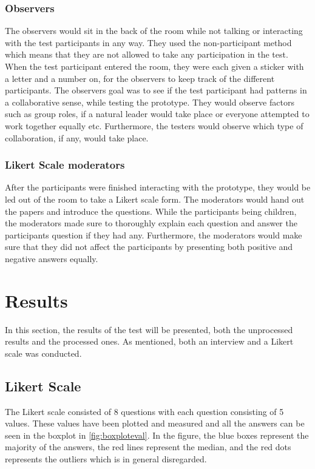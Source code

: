 \subsubsection*{Observers}
The observers would sit in the back of the room while not talking or interacting with the test participants in any way. They used the non-participant method which means that they are not allowed to take any participation in the test. When the test participant entered the room, they were each given a sticker with a letter and a number on, for the observers to keep track of the different participants. The observers goal was to see if the test participant had patterns in a collaborative sense, while testing the prototype. They would observe factors such as group roles, if a natural leader would take place or everyone attempted to work together equally etc. Furthermore, the testers would observe which type of collaboration, if any, would take place. 

\subsubsection*{Likert Scale moderators}
After the participants were finished interacting with the prototype, they would be led out of the room to take a Likert scale form. The moderators would hand out the papers and introduce the questions. While the participants being children, the moderators made sure to thoroughly explain each question and answer the participants question if they had any. Furthermore, the moderators would make sure that they did not affect the participants by presenting both positive and negative answers equally.

\section{Results}
In this section, the results of the test will be presented, both the unprocessed results and the processed ones. As mentioned, both an interview and a Likert scale was conducted. 

\subsection{Likert Scale}
The Likert scale consisted of 8 questions with each question consisting of 5 values. These values have been plotted and measured and all the answers can be seen in the boxplot in \autoref{fig:boxploteval}. In the figure, the blue boxes represent the majority of the answers, the red lines represent the median, and the red dots represents the outliers which is in general disregarded. 

